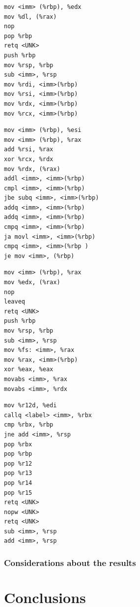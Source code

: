\documentclass[12pt,a4paper]{book}
\theoremstyle{definition}
\begin{document}
	\begin{minipage}{.45\textwidth}
	\begin{lstlisting}[caption={Window 11024-11031}]
mov <imm> (%rbp), %edx
mov %dl, (%rax)
nop
pop %rbp
retq <UNK>
push %rbp
mov %rsp, %rbp
sub <imm>, %rsp
mov %rdi, <imm>(%rbp)
mov %rsi, <imm>(%rbp)
mov %rdx, <imm>(%rbp)
mov %rcx, <imm>(%rbp)
	\end{lstlisting}
\end{minipage}\hfill
\begin{minipage}{.45\textwidth}
	\begin{lstlisting}[caption={Window 11351-11392}]
mov <imm> (%rbp), %esi
mov <imm> (%rbp), %rax
add %rsi, %rax
xor %rcx, %rdx
mov %rdx, (%rax)
addl <imm>, <imm>(%rbp)
cmpl <imm>, <imm>(%rbp)
jbe subq <imm>, <imm>(%rbp)
addq <imm>, <imm>(%rbp)
addq <imm>, <imm>(%rbp)
cmpq <imm>, <imm>(%rbp)
ja movl <imm>, <imm>(%rbp)
cmpq <imm>, <imm>(%rbp )
je mov <imm>, (%rbp)
	\end{lstlisting}
\end{minipage}

	\begin{minipage}{.45\textwidth}
	\begin{lstlisting}[caption={Window 11598-11601}]
mov <imm> (%rbp), %rax
mov %edx, (%rax)
nop
leaveq
retq <UNK>
push %rbp
mov %rsp, %rbp
sub <imm>, %rsp
mov %fs: <imm>, %rax
mov %rax, <imm>(%rbp)
xor %eax, %eax
movabs <imm>, %rax
movabs <imm>, %rdx
	\end{lstlisting}
\end{minipage}\hfill
\begin{minipage}{.45\textwidth}
	\begin{lstlisting}[caption={Window 11868-11902}]
mov %r12d, %edi
callq <label> <imm>, %rbx
cmp %rbx, %rbp
jne add <imm>, %rsp
pop %rbx
pop %rbp
pop %r12
pop %r13
pop %r14
pop %r15
retq <UNK>
nopw <UNK>
retq <UNK>
sub <imm>, %rsp
add <imm>, %rsp
	\end{lstlisting}
\end{minipage}



	\subsection{Considerations about the results}
	
	\chapter{Conclusions}
	
\end{document}
